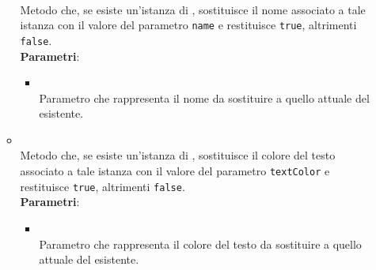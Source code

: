 \begin{itemize}
\begin{itemize}
\\ Metodo che, se esiste un'istanza di , sostituisce il nome associato a tale istanza con il valore del parametro \texttt{name} e restituisce \texttt{true}, altrimenti \texttt{false}.
\\ \textbf{Parametri}:
\begin{itemize}
\item {}
\\ Parametro che rappresenta il nome da sostituire a quello attuale del  esistente.
\end{itemize}
\item {}
\\ Metodo che, se esiste un'istanza di , sostituisce il colore del testo associato a tale istanza con il valore del parametro \texttt{textColor} e restituisce \texttt{true}, altrimenti \texttt{false}.
\\ \textbf{Parametri}:
\begin{itemize}
\item {}
\\ Parametro che rappresenta il colore del testo da sostituire a quello attuale del  esistente.
\end{itemize}
\end{itemize}
\end{itemize}
\subsection{}
\label{\nogloxy{Premi::Front-End::Services}}
